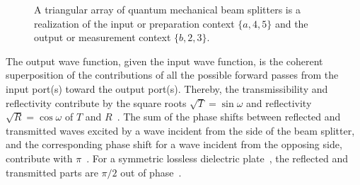 \documentclass[%
 reprint,
 superscriptaddress,
 showpacs,
 showkeys,
 nofootinbib,
  amsmath,amssymb,
 pra,
  longbibliography,
  floatfix,
 ]{revtex4-2}
\theoremstyle{definition}
\begin{document}
\begin{figure}[ht]
\begin{center}
{
}
\end{center}
\caption{A triangular array of quantum mechanical beam splitters is a realization of the input or preparation context $\{a,4,5\}$ and the output or measurement context $\{b,2,3\}$.
\label{2023-viext-bsr}}
\end{figure}



The output wave function, given the input wave function,
is the coherent superposition of the contributions of all the possible forward passes from the input port(s) toward the output port(s).
Thereby, the transmissibility and reflectivity contribute by the square roots $\sqrt{T}=\sin \omega$
and reflectivity $\sqrt{R}=\cos \omega$ of $T$ and $R$~\cite{green-horn-zei}.
The sum of the phase shifts between reflected and transmitted waves
excited by a wave incident from the side of the beam splitter, and the corresponding phase shift
for a wave incident from the opposing side, contribute with $\pi$~\cite{zeilinger:882}.
For a symmetric lossless dielectric plate~\cite{Lai_1985},
the reflected and transmitted parts are $\pi/2$ out of phase~\cite{Degiorgio_1980,green-horn-zei}.
\end{document}
